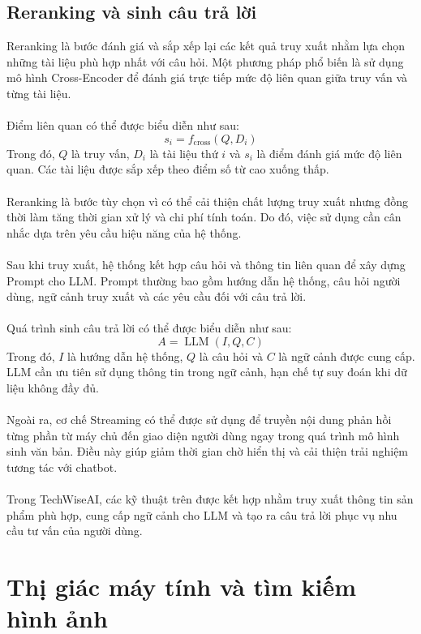 \documentclass{report}
\begin{document}
\subsection{Reranking và sinh câu trả lời}
Reranking là bước đánh giá và sắp xếp lại các kết quả truy xuất nhằm lựa chọn những tài liệu phù hợp nhất với câu hỏi. Một phương pháp phổ biến là sử dụng mô hình Cross-Encoder để đánh giá trực tiếp mức độ liên quan giữa truy vấn và từng tài liệu.\\\\
Điểm liên quan có thể được biểu diễn như sau:
\[
s_i=f_{\text{cross}}(Q,D_i)
\]
Trong đó, $Q$ là truy vấn, $D_i$ là tài liệu thứ $i$ và $s_i$ là điểm đánh giá mức độ liên quan. Các tài liệu được sắp xếp theo điểm số từ cao xuống thấp.\\\\
Reranking là bước tùy chọn vì có thể cải thiện chất lượng truy xuất nhưng đồng thời làm tăng thời gian xử lý và chi phí tính toán. Do đó, việc sử dụng cần cân nhắc dựa trên yêu cầu hiệu năng của hệ thống.\\\\
Sau khi truy xuất, hệ thống kết hợp câu hỏi và thông tin liên quan để xây dựng Prompt cho LLM. Prompt thường bao gồm hướng dẫn hệ thống, câu hỏi người dùng, ngữ cảnh truy xuất và các yêu cầu đối với câu trả lời.\\\\
Quá trình sinh câu trả lời có thể được biểu diễn như sau:
\[
A=\operatorname{LLM}(I,Q,C)
\]
Trong đó, $I$ là hướng dẫn hệ thống, $Q$ là câu hỏi và $C$ là ngữ cảnh được cung cấp. LLM cần ưu tiên sử dụng thông tin trong ngữ cảnh, hạn chế tự suy đoán khi dữ liệu không đầy đủ.\\\\
Ngoài ra, cơ chế Streaming có thể được sử dụng để truyền nội dung phản hồi từng phần từ máy chủ đến giao diện người dùng ngay trong quá trình mô hình sinh văn bản. Điều này giúp giảm thời gian chờ hiển thị và cải thiện trải nghiệm tương tác với chatbot.\\\\
Trong TechWiseAI, các kỹ thuật trên được kết hợp nhằm truy xuất thông tin sản phẩm phù hợp, cung cấp ngữ cảnh cho LLM và tạo ra câu trả lời phục vụ nhu cầu tư vấn của người dùng.

\section{Thị giác máy tính và tìm kiếm hình ảnh}
\end{document}
